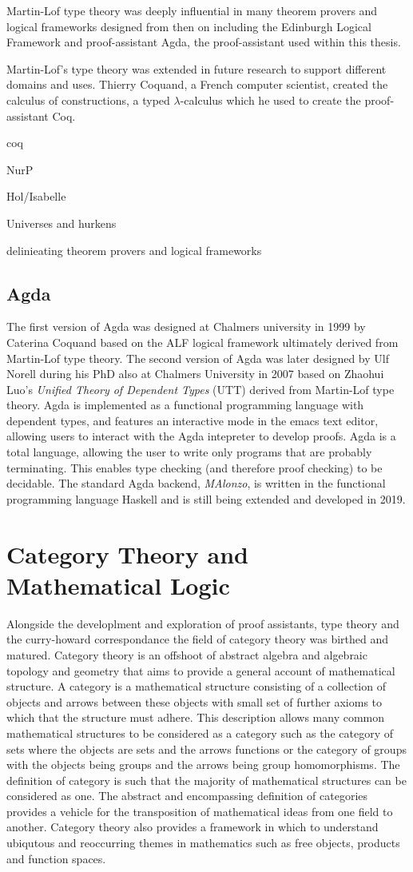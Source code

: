 Martin-Lof type theory was deeply influential in many theorem provers and
logical frameworks designed from then on including the Edinburgh Logical
Framework and proof-assistant Agda, the proof-assistant used within this thesis.

Martin-Lof's type theory was extended in future research to support different
domains and uses. Thierry Coquand, a French computer scientist, created the
calculus of constructions, a typed $\lambda$-calculus which he used to create
the proof-assistant Coq.

coq

NurP

Hol/Isabelle

Universes and hurkens

delinieating theorem provers and logical frameworks

\subsection{Agda}
The first version of Agda was designed at Chalmers university in 1999 by
Caterina Coquand based on the ALF logical framework ultimately derived from
Martin-Lof type theory. The second version of Agda was later designed by Ulf
Norell during his PhD also at Chalmers University in 2007 based on Zhaohui Luo's
\textit{Unified Theory of Dependent Types} (UTT) derived from Martin-Lof type
theory. Agda is implemented as a functional programming language with dependent
types, and features an interactive mode in the emacs text editor, allowing users
to interact with the Agda intepreter to develop proofs. Agda is a total
language, allowing the user to write only programs that are probably
terminating. This enables type checking (and therefore proof checking) to be
decidable. The standard Agda backend, \textit{MAlonzo}, is written in the
functional programming language Haskell and is still being extended and
developed in 2019.
\section{Category Theory and Mathematical Logic}
Alongside the developlment and exploration of  proof assistants, type theory and
the curry-howard correspondance the field of category theory was birthed and
matured. Category theory is an offshoot of abstract algebra and algebraic
topology and geometry that  aims to provide a general account of mathematical
structure. A category is a mathematical structure consisting of a collection of
objects and arrows between these objects with small set of further axioms to
which that the structure must adhere. This description allows many common
mathematical structures to be considered as a category such as the category of
sets where the objects are sets and the arrows functions or the category of
groups with the objects being groups and the arrows being group homomorphisms.
The definition of category is such that the majority of mathematical structures
can be considered as one. The abstract and encompassing definition of
categories provides a vehicle for the transposition of mathematical ideas from
one field to another. Category theory also provides a framework in which to
understand ubiqutous and reoccurring themes in mathematics such as free objects,
products and function spaces.
